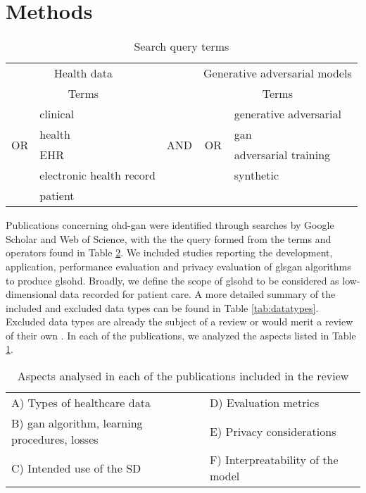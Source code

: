 \section{Methods}


\begin{table}[htb]
  \center
    \begin{tabular}{@{}clccl@{}} \toprule
	    \multicolumn{2}{c}{Health data} & & \multicolumn{2}{c}{Generative adversarial models} \\ \cmidrule{1-2} \cmidrule{4-5}
	    \multicolumn{2}{c}{Terms} & {} & \multicolumn{2}{c}{Terms} \\ \cmidrule{2-2} \cmidrule{5-5}
	    \multirow{4}{*}{OR} & clinical & \multirow[t]{4}{*}{\quad AND\quad} & \multirow{4}{*}{OR} & generative adversarial\\
	    {} & health & {} & {} & \gls{gan} \\ 
	    {} & EHR & {} & {} & adversarial training \\
	    {} & electronic health record & {} & {} & synthetic  \\
	    {} & patient & {} & {} & {} \\
	    \bottomrule
    \end{tabular}
    \caption{{Search query terms}}\label{tab:search}
\end{table}

Publications concerning \gls{ohd-gan} were identified through searches by Google Scholar and Web of Science, with the the query formed from the terms and operators found in Table \ref{tab:themes}. We included studies reporting the development, application, performance evaluation and privacy evaluation of gls{gan} algorithms to produce gls{ohd}. Broadly, we define the scope of gls{ohd} to be considered as low-dimensional data recorded for patient care. A more detailed summary of the included and excluded data types can be found in Table \ref{tab:datatypes}. Excluded data types are already the subject of a review or would merit a review of their own \cite{Yi_2019}\cite{Nakata2019}\cite{Anwar_2018}. In each of the publications, we analyzed the aspects listed in Table \ref{tab:search}.\par

\begin{table}[htb]
\centering
  \caption{Aspects analysed in each of the publications included in the review\label{tab:themes}}
  \begin{tabular}{ll}\toprule
  A) Types of healthcare data & D) Evaluation metrics\\
  B) \gls{gan} algorithm, learning procedures, losses & E) Privacy considerations\\
  C) Intended use of the SD & F) Interpreatability of the model\\\bottomrule
  \end{tabular}
\end{table}

